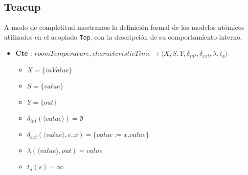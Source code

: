 \subsection{Teacup}
A modo de completitud mostramos la definición formal de los modelos atómicos 
utilizados en el acoplado \texttt{Top}, con la descripción de su comportamiento interno.
\begin{itemize}
	
	\item \textbf{Cte} : $ roomTemperature, characteristicTime \rightarrow \langle X, S, Y, \delta_{int}, \delta_{ext}, \lambda, t_{a} \rangle$ \newline
	\begin{itemize}
		\item $ X = \{ inValue \} $ \newline
		\item $ S = \{ value \} $ \newline
		\item $ Y = \{ out \} $ \newline
		\item $ \delta_{int}(\langle value \rangle) = \emptyset $ \newline
		\item $ \delta_{ext} (\langle value \rangle, e, x)= \{ value := x.value \} $ \newline
		\item $ \lambda(\langle value \rangle, out) = value $ \newline
		\item $ t_{a}(s) = \infty $ 
	\end{itemize}
	

\end{itemize}
